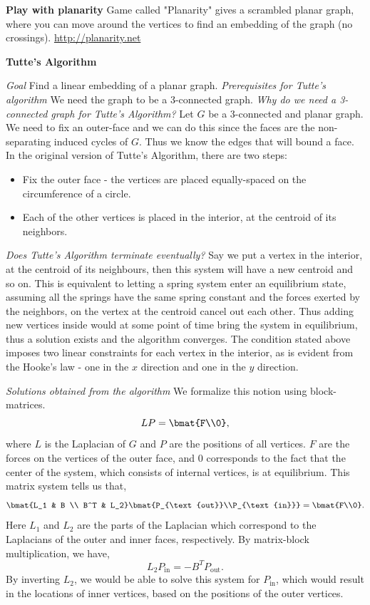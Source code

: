\documentclass{article}
\begin{document}

  \noindent \textbf{Play with planarity}
  Game called "Planarity" gives a scrambled planar graph, where you can move around the vertices to find an embedding of the graph (no crossings). \href{http://planarity.net}{http://planarity.net}
  
  \noindent \textbf{Tutte's Algorithm}
  
  \textit{Goal} Find a linear embedding of a planar graph.
  \noindent \textit{Prerequisites for Tutte's algorithm} We need the graph to be a 3-connected graph.
  \newline \noindent \textit{Why do we need a 3-connected graph for Tutte's Algorithm?} Let $G$ be a 3-connected and planar graph. We need to fix an outer-face and we can do this since the faces are the non-separating induced cycles of $G$. Thus we know the edges that will bound a face.
  In the original version of Tutte's Algorithm, there are two steps:
  \begin{itemize}
      \item Fix the outer face - the vertices are placed equally-spaced on the circumference of a circle.
      \item Each of the other vertices is placed in the interior, at the centroid of its neighbors. 
  \end{itemize} 
  \noindent \textit{Does Tutte's Algorithm terminate eventually?}
  Say we put a vertex in the interior, at the centroid of its neighbours, then this system will have a new centroid and so on.
  This is equivalent to letting a spring system enter an equilibrium state, assuming all the springs have the same spring constant and the forces exerted by the neighbors, on the vertex at the centroid cancel out each other. Thus adding new vertices inside would at some point of time bring the system in equilibrium, thus a solution exists and the algorithm converges.  
  The condition stated above imposes two linear constraints for each vertex in the interior, as is evident from the Hooke's law - one in the $x$ direction and one in the $y$ direction.
  
  \noindent \textit{Solutions obtained from the algorithm}
  We formalize this notion using block-matrices. $$LP = \bmat{F\\0},$$ where $L$ is the Laplacian of $G$ and $P$ are the positions of all vertices. $F$ are the forces on the vertices of the outer face, and $0$ corresponds to the fact that the center of the system, which consists of internal vertices, is at equilibrium. This matrix system tells us that, $$\bmat{L_1 & B \\ B^T & L_2}\bmat{P_{\text{out}}\\P_{\text{in}}} = \bmat{F\\0}.$$ Here $L_1$ and $L_2$ are the parts of the Laplacian which correspond to the Laplacians of the outer and inner faces, respectively. By matrix-block multiplication, we have, $$L_2P_{\text{in}} = -B^TP_{\text{out}}.$$ By inverting $L_2$, we would be able to solve this system for $P_{\text{in}}$, which would result in the locations of inner vertices, based on the positions of the outer vertices.
  
\end{document}
